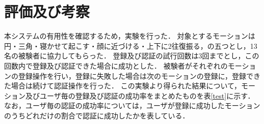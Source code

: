 \section{評価及び考察}
本システムの有用性を確認するため，実験を行った．
対象とするモーションは円・三角・寝かせて起こす・顔に近づける・上下に2往復振る，の五つとし，13名の被験者に協力してもらった．
登録及び認証の試行回数は3回までとし，この回数内で登録及び認証できた場合に成功とした．
被験者がそれぞれのモーションの登録操作を行い，登録に失敗した場合は次のモーションの登録に，登録できた場合は続けて認証操作を行った．
この実験より得られた結果について，モーション及びユーザ毎の登録及び認証の成功率をまとめたものを表\ref{test}に示す．
なお，ユーザ毎の認証の成功率については，ユーザが登録に成功したモーションのうちどれだけの割合で認証に成功したかを表している．

